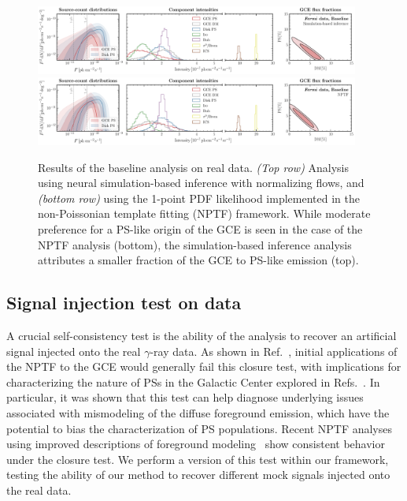 \documentclass[prd,aps,10pt,nofootinbib,twocolumn,superscriptaddress,preprintnumbers,balancelastpage,longbibliography]{revtex4-1}
\begin{document}
%
\begin{figure}
\centering
\includegraphics[width=0.95\textwidth]{plots/data_fid_sbi.pdf}
\includegraphics[width=0.95\textwidth]{plots/data_fid_nptf.pdf}
\caption{Results of the baseline analysis on real \Fermi data. \emph{(Top row)} Analysis using neural simulation-based inference with normalizing flows, and \emph{(bottom row)} using the 1-point PDF likelihood implemented in the non-Poissonian template fitting (NPTF) framework. While moderate preference for a PS-like origin of the GCE is seen in the case of the NPTF analysis (bottom), the simulation-based inference analysis attributes a smaller fraction of the GCE to PS-like emission (top).}
\label{fig:fid_data}
\end{figure}
%

\subsection{Signal injection test on data}
\label{sec:sig-injection}

A crucial self-consistency test is the ability of the analysis to recover an artificial signal injected onto the real $\gamma$-ray data. As shown in Ref.~\cite{Leane:2019xiy}, initial applications of the NPTF to the GCE would generally fail this closure test, with implications for characterizing the nature of PSs in the Galactic Center explored in Refs.~\cite{Chang:2019ars,Buschmann:2020adf}. In particular, it was shown that this test can help diagnose underlying issues associated with mismodeling of the diffuse foreground emission, which have the potential to bias the characterization of PS populations. Recent NPTF analyses using improved descriptions of foreground modeling~\cite{Buschmann:2020adf} show consistent behavior under the closure test. We perform a version of this test within our framework, testing the ability of our method to recover different mock signals injected onto the real \Fermi data.
\end{document}
